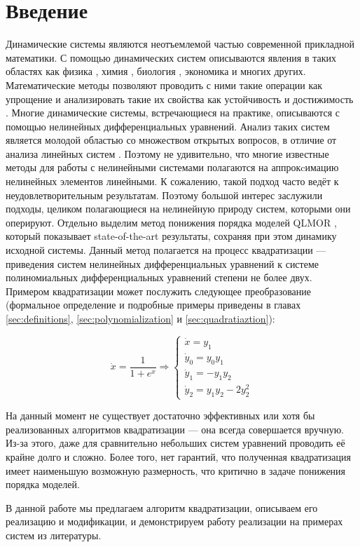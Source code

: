 
\section{Введение}

Динамические системы являются неотъемлемой частью современной прикладной математики. С помощью динамических систем описываются явления в таких областях как физика \cite{physics-example}, химия \cite{chemistry-example}, биология \cite{biology-example}, экономика \cite{economics-example} и многих других. Математические методы позволяют проводить с ними такие операции как упрощение \cite{MOR-book} и анализировать такие их свойства как устойчивость \cite{Strogatz-book} и достижимость \cite{Scott-reachability}. Многие динамические системы, встречающиеся на практике, описываются с помощью нелинейных дифференциальных уравнений. Анализ таких  систем является молодой областью со множеством открытых вопросов, в отличие от анализа линейных систем \cite{MOR-linear-overview}. Поэтому не удивительно, что многие известные методы для работы с нелинейными системами полагаются на аппрокcимацию нелинейных элементов линейными. К сожалению, такой подход часто ведёт к неудовлетворительным результатам. 
Поэтому большой интерес заслужили подходы, целиком полагающиеся на нелинейную природу систем, которыми они оперируют. 
Отдельно выделим метод понижения порядка моделей QLMOR \cite{Gu-PhD, Kramer-Willcox}, который показывает state-of-the-art результаты, сохраняя при этом динамику исходной системы. 
Данный метод полагается на процесс квадратизации --- приведения систем нелинейных дифференциальных уравнений к системе полиномиальных дифференциальных уравнений степени не более двух. 
Примером квадратизации может послужить следующее преобразование (формальное определение и подробные примеры приведены в главах \ref{sec:definitions}, \ref{sec:polynomialization} и \ref{sec:quadratiaztion}):

\[
     \dot x = \frac{1}{1 + e^x} 
\Longrightarrow
\begin{cases}
    \dot x = y_1 \\
    \dot y_0 = y_0 y_1 \\
    \dot y_1 = -y_1 y_2 \\
    \dot y_2 = y_1 y_2 - 2y_2^2
\end{cases}
\]

На данный момент не существует достаточно эффективных или хотя бы реализованных алгоритмов квадратизации --- она всегда совершается вручную.
Из-за этого, даже для сравнительно небольших систем уравнений проводить её крайне долго и сложно. 
Более того, нет гарантий, что полученная квадратизация имеет наименьшую возможную размерность, что критично в задаче понижения порядка моделей. 

В данной работе мы предлагаем алгоритм квадратизации, описываем его реализацию и модификации, и демонстрируем работу реализации на примерах систем из литературы.